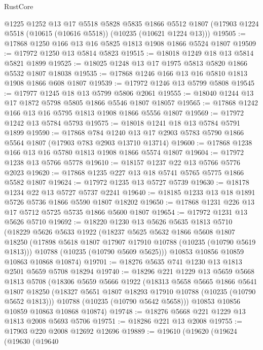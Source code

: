\begin{lexlean}{RustCore}
\begin{coremodule}
    @1225
    @1252
    @13
    @17
    @5518
    @5828
    @5835
    @1866
    @5512
    @1807
    (@17903 @1224 @5518 (@10615 (@10616 @5518)) (@10235 (@10621 @1224 @13)))
@19505 := @17868 @1250 @166 @13 @16 @5825 @1813 @1908 @1866 @5524 @1807
@19509 := @17972 @1250 @13 @5814 @5823
@19515 := @18018 @1249 @18 @13 @5814 @5821 @1899
@19525 := @18025 @1248 @13 @17 @1975 @5813 @5820 @1866 @5532 @1807 @18038
@19535 := @17868 @1246 @166 @13 @16 @5810 @1813 @1908 @1866 @608 @1807
@19539 := @17972 @1246 @13 @5799 @5808
@19545 := @17977 @1245 @18 @13 @5799 @5806 @2061
@19555 := @18040 @1244 @13 @17 @1872 @5798 @5805 @1866 @5546 @1807 @18057
@19565 := @17868 @1242 @166 @13 @16 @5795 @1813 @1908 @1866 @5556 @1807
@19569 := @17972 @1242 @13 @5784 @5793
@19575 := @18018 @1241 @18 @13 @5784 @5791 @1899
@19590 := @17868
    @784
    @1240
    @13
    @17
    @2903
    @5783
    @5790
    @1866
    @5564
    @1807
    (@17903 @783 @2903 @13710 @13714)
@19600 := @17868 @1238 @166 @13 @16 @5780 @1813 @1908 @1866 @5574 @1807
@19604 := @17972 @1238 @13 @5766 @5778
@19610 := @18157 @1237 @22 @13 @5766 @5776 @2023
@19620 := @17868 @1235 @227 @13 @18 @5741 @5765 @5775 @1866 @5582 @1807
@19624 := @17972 @1235 @13 @5727 @5739
@19630 := @18178 @1234 @22 @13 @5727 @5737 @2241
@19640 := @18185 @1233 @13 @18 @1891 @5726 @5736 @1866 @5590 @1807 @18202
@19650 := @17868 @1231 @226 @13 @17 @5712 @5725 @5735 @1866 @5600 @1807
@19654 := @17972 @1231 @13 @5626 @5710
@19692 := @18220
    @1230
    @13
    @5626
    @5635
    @1813
    @5710
    (@18229
      @5626
      @5633
      @1922
      (@18237
        @5625
        @5632
        @1866
        @5608
        @1807
        @18250
        (@17898 @5618 @1807 @17907 @17910 @10788 (@10235 (@10790 @5619 @1813)))
        @10788
        (@10235 (@10790 @5609 @5625)))
      @10853
      @10856
      @10859
      @10863
      @10868
      @10874)
@19701 := @18276 @5635 @741 @1230 @13 @1813 @2501 @5659 @5708 @18294
@19740 := @18296
    @221
    @1229
    @13
    @5659
    @5668
    @1813
    @5708
    (@18306
      @5659
      @5666
      @1922
      (@18313
        @5658
        @5665
        @1866
        @5641
        @1807
        @18250
        (@18327 @5651 @1807 @18293 @17910 @10788 (@10235 (@10790 @5652 @1813)))
        @10788
        (@10235 (@10790 @5642 @5658)))
      @10853
      @10856
      @10859
      @10863
      @10868
      @10874)
@19748 := @18276 @5668 @221 @1229 @13 @1813 @2008 @5693 @5706
@19751 := @18286 @221 @13 @2008
@19755 := @17903 @220 @2008 @12692 @12696
@19889 := @19610
    (@19620
      (@19624
        (@19630
          (@19640

\end{coremodule}
\end{lexlean}
